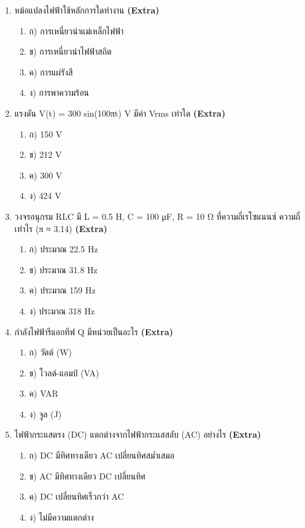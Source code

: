 \documentclass[12pt]{article}
\begin{document}
\begin{enumerate}[label=\arabic*.]
\begin{enumerate}[label=)]
\end{enumerate}
\item หม้อแปลงไฟฟ้าใช้หลักการใดทำงาน \hfill \textbf{\small (Extra)}
\begin{enumerate}[label=)]
\item ก) การเหนี่ยวนำแม่เหล็กไฟฟ้า
\item ข) การเหนี่ยวนำไฟฟ้าสถิต
\item ค) การแผ่รังสี
\item ง) การพาความร้อน
\end{enumerate}
\item แรงดัน V(t) = 300 sin(100πt) V มีค่า Vrms เท่าใด \hfill \textbf{\small (Extra)}
\begin{enumerate}[label=)]
\item ก) 150 V
\item ข) 212 V
\item ค) 300 V
\item ง) 424 V
\end{enumerate}
\item วงจรอนุกรม RLC มี L = 0.5 H, C = 100 μF, R = 10 Ω ที่ความถี่เรโซแนนซ์ ความถี่เท่าไร (π ≈ 3.14) \hfill \textbf{\small (Extra)}
\begin{enumerate}[label=)]
\item ก) ประมาณ 22.5 Hz
\item ข) ประมาณ 31.8 Hz
\item ค) ประมาณ 159 Hz
\item ง) ประมาณ 318 Hz
\end{enumerate}
\item กำลังไฟฟ้ารีแอกทีฟ Q มีหน่วยเป็นอะไร \hfill \textbf{\small (Extra)}
\begin{enumerate}[label=)]
\item ก) วัตต์ (W)
\item ข) โวลต์-แอมป์ (VA)
\item ค) VAR
\item ง) จูล (J)
\end{enumerate}
\item ไฟฟ้ากระแสตรง (DC) แตกต่างจากไฟฟ้ากระแสสลับ (AC) อย่างไร \hfill \textbf{\small (Extra)}
\begin{enumerate}[label=)]
\item ก) DC มีทิศทางเดียว AC เปลี่ยนทิศสม่ำเสมอ
\item ข) AC มีทิศทางเดียว DC เปลี่ยนทิศ
\item ค) DC เปลี่ยนทิศเร็วกว่า AC
\item ง) ไม่มีความแตกต่าง
\end{enumerate}

\end{enumerate}
\end{document}
